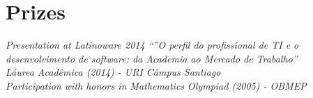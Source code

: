 \documentclass[10pt]{article} %
\begin{document}


\section{Prizes}

{
\textit{Presentation at Latinoware 2014 “”O perfil do profissional de TI e o desenvolvimento de software: da Academia ao Mercado de Trabalho”}\\
\textit{Láurea Acadêmica (2014) - URI Câmpus Santiago}\\
\textit{Participation with honors in Mathematics Olympiad (2005) - OBMEP}\\
}

\end{document}
